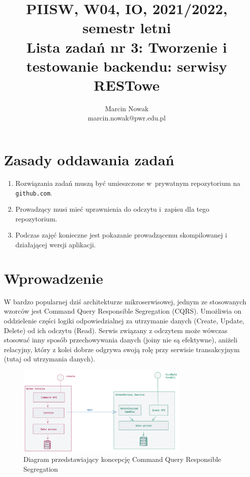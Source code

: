 \documentclass[12pt]{article}
\title{PIISW, W04, IO, 2021/2022, semestr letni\\Lista zadań nr 3: Tworzenie i testowanie backendu: serwisy RESTowe}
\author{Marcin Nowak\\ \small marcin.nowak@pwr.edu.pl}
\begin{document}
    \maketitle

    \section*{Zasady oddawania zadań}
    \begin{enumerate}
        \item Rozwiązania zadań muszą być umieszczone w~prywatnym repozytorium na \texttt{git\-hub.com}.
        \item Prowadzący musi mieć uprawnienia do odczytu i~zapisu dla tego repozytorium.
        \item Podczas zajęć konieczne jest pokazanie prowadzącemu skompilowanej i działającej wersji aplikacji.
    \end{enumerate}

    \section*{Wprowadzenie}
    W bardzo popularnej dziś architekturze mikroserwisowej, jednym ze stosowanych wzorców jest Command Query Responsible Segregation (CQRS).
    Umożliwia on oddzielenie części logiki odpowiedzialnej za utrzymanie danych (Create, Update, Delete) od ich odczytu (Read).
    Serwis związany z odczytem może wówczas stosować inny sposób przechowywania danych (joiny nie są efektywne),
    aniżeli relacyjny, który z kolei dobrze odgrywa swoją rolę przy serwisie transakcyjnym (tutaj od utrzymania danych).
    \\
    \begin{figure}[!htb]
        \centering
        \includegraphics[width=0.75\textwidth]{lista-3-cqrs-diagram.png}
        \caption{Diagram przedstawiający koncepcję Command Query Responsible Segregation}
        \label{fig:swagger-orders-gr}
    \end{figure}
\end{document}
